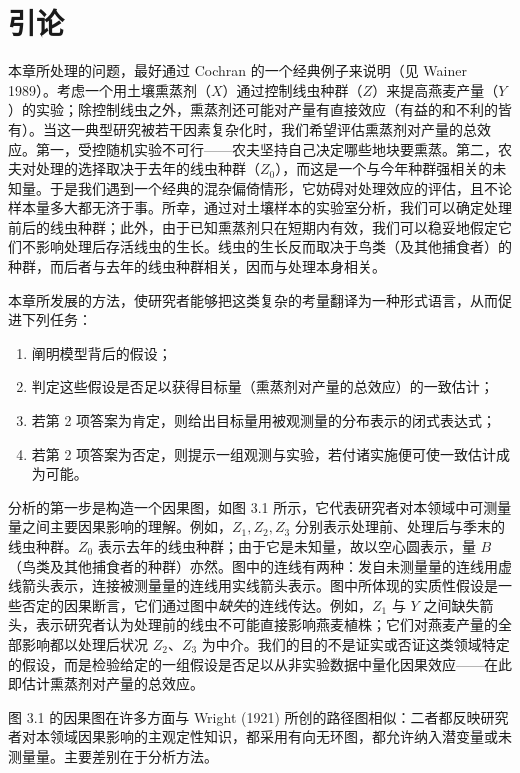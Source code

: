 \section{引论}

本章所处理的问题，最好通过 Cochran 的一个经典例子来说明（见 Wainer 1989）。考虑一个用土壤熏蒸剂（$X$）通过控制线虫种群（$Z$）来提高燕麦产量（$Y$）的实验；除控制线虫之外，熏蒸剂还可能对产量有直接效应（有益的和不利的皆有）。当这一典型研究被若干因素复杂化时，我们希望评估熏蒸剂对产量的总效应。第一，受控随机实验不可行——农夫坚持自己决定哪些地块要熏蒸。第二，农夫对处理的选择取决于去年的线虫种群（$Z_0$），而这是一个与今年种群强相关的未知量。于是我们遇到一个经典的混杂偏倚情形，它妨碍对处理效应的评估，且不论样本量多大都无济于事。所幸，通过对土壤样本的实验室分析，我们可以确定处理前后的线虫种群；此外，由于已知熏蒸剂只在短期内有效，我们可以稳妥地假定它们不影响处理后存活线虫的生长。线虫的生长反而取决于鸟类（及其他捕食者）的种群，而后者与去年的线虫种群相关，因而与处理本身相关。

本章所发展的方法，使研究者能够把这类复杂的考量翻译为一种形式语言，从而促进下列任务：
\begin{enumerate}[label=\arabic*.,leftmargin=1.8em]
\item 阐明模型背后的假设；
\item 判定这些假设是否足以获得目标量（熏蒸剂对产量的总效应）的一致估计；
\item 若第 2 项答案为肯定，则给出目标量用被观测量的分布表示的闭式表达式；
\item 若第 2 项答案为否定，则提示一组观测与实验，若付诸实施便可使一致估计成为可能。
\end{enumerate}

分析的第一步是构造一个因果图，如图 3.1 所示，它代表研究者对本领域中可测量量之间主要因果影响的理解。例如，$Z_1,Z_2,Z_3$ 分别表示处理前、处理后与季末的线虫种群。$Z_0$ 表示去年的线虫种群；由于它是未知量，故以空心圆表示，量 $B$（鸟类及其他捕食者的种群）亦然。图中的连线有两种：发自未测量量的连线用虚线箭头表示，连接被测量量的连线用实线箭头表示。图中所体现的实质性假设是一些否定的因果断言，它们通过图中\emph{缺失}的连线传达。例如，$Z_1$ 与 $Y$ 之间缺失箭头，表示研究者认为处理前的线虫不可能直接影响燕麦植株；它们对燕麦产量的全部影响都以处理后状况 $Z_2$、$Z_3$ 为中介。我们的目的不是证实或否证这类领域特定的假设，而是检验给定的一组假设是否足以从非实验数据中量化因果效应——在此即估计熏蒸剂对产量的总效应。

图 3.1 的因果图在许多方面与 Wright (1921) 所创的路径图相似：二者都反映研究者对本领域因果影响的主观定性知识，都采用有向无环图，都允许纳入潜变量或未测量量。主要差别在于分析方法。

